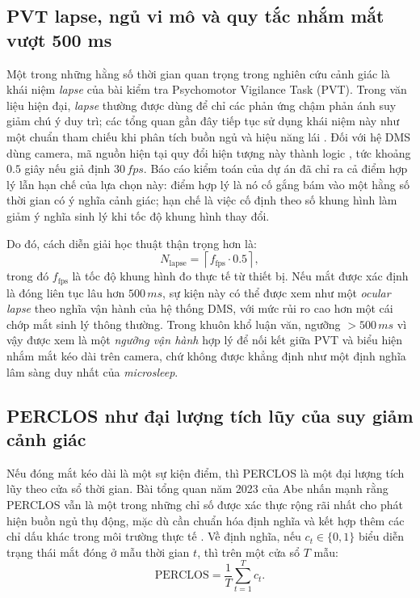 \documentclass[12pt,a4paper]{article}
\begin{document}
\subsection{PVT lapse, ngủ vi mô và quy tắc nhắm mắt vượt 500 ms}
Một trong những hằng số thời gian quan trọng trong nghiên cứu cảnh giác là khái niệm \textit{lapse} của bài kiểm tra Psychomotor Vigilance Task (PVT). Trong văn liệu hiện đại, \textit{lapse} thường được dùng để chỉ các phản ứng chậm phản ánh suy giảm chú ý duy trì; các tổng quan gần đây tiếp tục sử dụng khái niệm này như một chuẩn tham chiếu khi phân tích buồn ngủ và hiệu năng lái \cite{hussein2023,abe2023}. Đối với hệ DMS dùng camera, mã nguồn hiện tại quy đổi hiện tượng này thành logic , tức khoảng \(0.5\) giây nếu giả định \(30\,fps\). Báo cáo kiểm toán của dự án đã chỉ ra cả điểm hợp lý lẫn hạn chế của lựa chọn này: điểm hợp lý là nó cố gắng bám vào một hằng số thời gian có ý nghĩa cảnh giác; hạn chế là việc cố định theo số khung hình làm giảm ý nghĩa sinh lý khi tốc độ khung hình thay đổi.

Do đó, cách diễn giải học thuật thận trọng hơn là:
\[
N_{\text{lapse}} = \left\lceil f_{\text{fps}} \cdot 0.5 \right\rceil,
\]
trong đó \(f_{\text{fps}}\) là tốc độ khung hình đo thực tế từ thiết bị. Nếu mắt được xác định là đóng liên tục lâu hơn \(500\,ms\), sự kiện này có thể được xem như một \textit{ocular lapse} theo nghĩa vận hành của hệ thống DMS, với mức rủi ro cao hơn một cái chớp mắt sinh lý thông thường. Trong khuôn khổ luận văn, ngưỡng \(>500\,ms\) vì vậy được xem là một \textit{ngưỡng vận hành} hợp lý để nối kết giữa PVT và biểu hiện nhắm mắt kéo dài trên camera, chứ không được khẳng định như một định nghĩa lâm sàng duy nhất của \textit{microsleep}.

\subsection{PERCLOS như đại lượng tích lũy của suy giảm cảnh giác}
Nếu đóng mắt kéo dài là một sự kiện điểm, thì PERCLOS là một đại lượng tích lũy theo cửa sổ thời gian. Bài tổng quan năm 2023 của Abe nhấn mạnh rằng PERCLOS vẫn là một trong những chỉ số được xác thực rộng rãi nhất cho phát hiện buồn ngủ thụ động, mặc dù cần chuẩn hóa định nghĩa và kết hợp thêm các chỉ dấu khác trong môi trường thực tế \cite{abe2023}. Về định nghĩa, nếu \(c_t \in \{0,1\}\) biểu diễn trạng thái mắt đóng ở mẫu thời gian \(t\), thì trên một cửa sổ \(T\) mẫu:
\[
\mathrm{PERCLOS} = \frac{1}{T}\sum_{t=1}^{T} c_t.
\]
\end{document}
